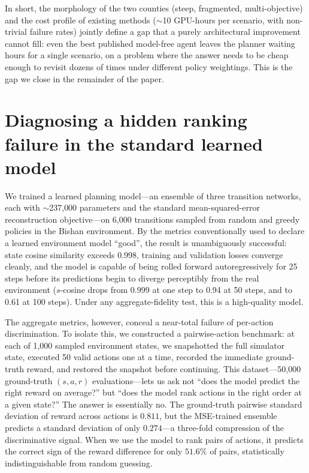 \documentclass[11pt]{article}
\begin{document}
In short, the morphology of the two counties (steep, fragmented, multi-objective) and the cost profile of existing methods ($\sim$10 GPU-hours per scenario, with non-trivial failure rates) jointly define a gap that a purely architectural improvement cannot fill: even the best published model-free agent leaves the planner waiting hours for a single scenario, on a problem where the answer needs to be cheap enough to revisit dozens of times under different policy weightings. This is the gap we close in the remainder of the paper.

\section{Diagnosing a hidden ranking failure in the standard learned model}\label{sec:rank}

We trained a learned planning model---an ensemble of three transition networks, each with $\sim$237{,}000 parameters and the standard mean-squared-error reconstruction objective---on 6{,}000 transitions sampled from random and greedy policies in the Bishan environment. By the metrics conventionally used to declare a learned environment model ``good'', the result is unambiguously successful: state cosine similarity exceeds 0.998, training and validation losses converge cleanly, and the model is capable of being rolled forward autoregressively for 25 steps before its predictions begin to diverge perceptibly from the real environment ($s$-cosine drops from 0.999 at one step to 0.94 at 50 steps, and to 0.61 at 100 steps). Under any aggregate-fidelity test, this is a high-quality model.

The aggregate metrics, however, conceal a near-total failure of per-action discrimination. To isolate this, we constructed a pairwise-action benchmark: at each of 1{,}000 sampled environment states, we snapshotted the full simulator state, executed 50 valid actions one at a time, recorded the immediate ground-truth reward, and restored the snapshot before continuing. This dataset---50{,}000 ground-truth $(s, a, r)$ evaluations---lets us ask not ``does the model predict the right reward on average?'' but ``does the model rank actions in the right order at a given state?'' The answer is essentially no. The ground-truth pairwise standard deviation of reward across actions is $0.811$, but the MSE-trained ensemble predicts a standard deviation of only $0.274$---a three-fold compression of the discriminative signal. When we use the model to rank pairs of actions, it predicts the correct sign of the reward difference for only $51.6\%$ of pairs, statistically indistinguishable from random guessing.
\end{document}
